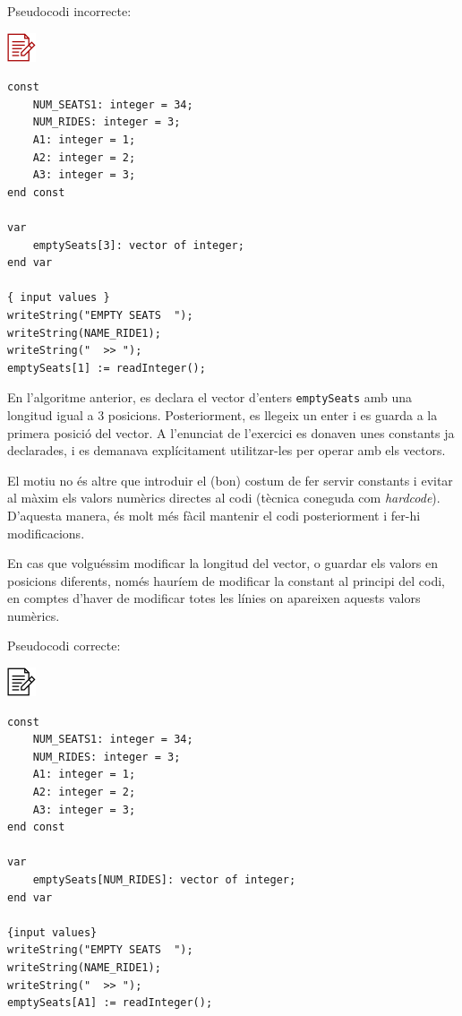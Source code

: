 \documentclass[
]{book}
\begin{document}
Pseudocodi incorrecte:

\includegraphics{./img/alg_err.png}

\begin{verbatim}
const 
    NUM_SEATS1: integer = 34;
    NUM_RIDES: integer = 3;
    A1: integer = 1;
    A2: integer = 2;
    A3: integer = 3;
end const

var
    emptySeats[3]: vector of integer;
end var

{ input values }
writeString("EMPTY SEATS  ");
writeString(NAME_RIDE1);
writeString("  >> ");
emptySeats[1] := readInteger();
\end{verbatim}

En l'algoritme anterior, es declara el vector d'enters \texttt{emptySeats} amb una longitud igual a 3 posicions. Posteriorment, es llegeix un enter i es guarda a la primera posició del vector. A l'enunciat de l'exercici es donaven unes constants ja declarades, i es demanava explícitament utilitzar-les per operar amb els vectors.

El motiu no és altre que introduir el (bon) costum de fer servir constants i evitar al màxim els valors numèrics directes al codi (tècnica coneguda com \emph{hardcode}). D'aquesta manera, és molt més fàcil mantenir el codi posteriorment i fer-hi modificacions.

En cas que volguéssim modificar la longitud del vector, o guardar els valors en posicions diferents, només hauríem de modificar la constant al principi del codi, en comptes d'haver de modificar totes les línies on apareixen aquests valors numèrics.

Pseudocodi correcte:

\includegraphics{./img/alg.png}

\begin{verbatim}
const 
    NUM_SEATS1: integer = 34;
    NUM_RIDES: integer = 3;
    A1: integer = 1;
    A2: integer = 2;
    A3: integer = 3;
end const

var
    emptySeats[NUM_RIDES]: vector of integer;
end var

{input values}
writeString("EMPTY SEATS  ");
writeString(NAME_RIDE1);
writeString("  >> ");
emptySeats[A1] := readInteger();
\end{verbatim}
\end{document}
